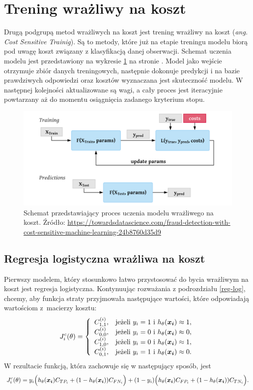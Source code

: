\documentclass[inzynierska]{pwr_wmat_praca_dyplomowa}
\theoremstyle{plain}
\numberwithin{theorem}{chapter}
\theoremstyle{definition}
\numberwithin{theorem}{chapter}
\begin{document}
\section{Trening wrażliwy na koszt}
Drugą podgrupą metod wrażliwych na koszt jest trening wrażliwy na koszt (\textit{ang. Cost Sensitive Trainig}). Są to metody, które już na etapie treningu modelu biorą pod uwagę koszt związany z klasyfikacją danej obserwacji. Schemat uczenia modelu jest przedstawiony na wykresie \ref{cst} na stronie \pageref{cst}. Model jako wejście otrzymuje zbiór danych treningowych, następnie dokonuje predykcji i na bazie prawdziwych odpowiedzi oraz kosztów wyznaczana jest skuteczność modelu. W następnej kolejności aktualizowane są wagi, a cały proces jest iteracyjnie powtarzany aż do momentu osiągnięcia zadanego kryterium stopu.
\begin{figure}[h]
	\includegraphics[width=\linewidth]{images/cost_sensitive_training.png}
	\caption{Schemat przedstawiający proces uczenia modelu wrażliwego na koszt. Źródło: \url{https://towardsdatascience.com/fraud-detection-with-cost-sensitive-machine-learning-24b8760d35d9}}
	\label{cst}
\end{figure}	

\subsection{Regresja logistyczna wrażliwa na koszt}
Pierwszy modelem, który stosunkowo łatwo przystosować do bycia wrażliwym na koszt jest regresja logistyczna. Kontynuując rozważania z podrozdziału \ref{reg-log}, chcemy, aby funkcja straty przyjmowała następujące wartości, które odpowiadają wartościom z~macierzy kosztu:
$$
J^c_i(\theta)=\left\{
\begin{array}{rl}
C^{(i)}_{1,1}, &\mbox{jeżeli $y_i = 1$ i $h_{\theta}(\boldsymbol{x_i}) \approx 1$}, \\
C^{(i)}_{0,0}, &\mbox{jeżeli $y_i = 0$ i $h_{\theta}(\boldsymbol{x_i}) \approx 0$}, \\
C^{(i)}_{1,0}, &\mbox{jeżeli $y_i = 0$ i $h_{\theta}(\boldsymbol{x_i}) \approx 1$}, \\
C^{(i)}_{0,1}, &\mbox{jeżeli $y_i = 1$ i $h_{\theta}(\boldsymbol{x_i}) \approx 0$}.
\end{array}
\right.
$$
W rezultacie funkcją, która zachowuje się w następujący sposób, jest
\begin{equation}
	J^c_i(\theta) = y_i \Big( h_{\theta}(\boldsymbol{x_i}) C_{TP_i} + (1 - h_{\theta}(\boldsymbol{x_i}))C_{FN_i} \Big) + (1-y_i) \Big( h_{\theta}(\boldsymbol{x_i}) C_{FP_i} + (1 - h_{\theta}(\boldsymbol{x_i}))C_{TN_i} \Big) \text{.}
\end{equation}
\end{document}
